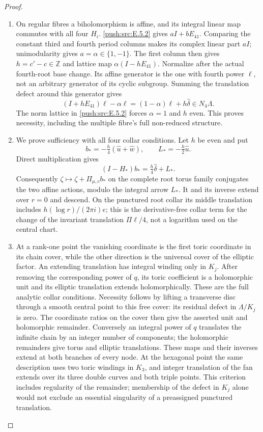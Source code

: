 \begin{proof}
\begin{enumerate}[label={$\langle1\rangle$\arabic*.},leftmargin=*]
\item On regular fibres a biholomorphism is affine, and its integral
linear map commutes with all four $H_i$.  \ref{push:src:E.5.2} gives
$aI+bE_{41}$.  Comparing the constant third and fourth
period columns makes its complex linear part $aI$;
unimodularity gives $a=\alpha\in\{1,-1\}$.
The first column then gives $h=c'-c\in\mathbb Z$ and
lattice map $\alpha(I-hE_{41})$.
Normalize after the actual fourth-root base change.  Its
affine generator is the one with fourth power $\ell$, not
an arbitrary generator of its cyclic subgroup.  Summing the
translation defect around this generator gives
\[
 (I+hE_{41})\ell-\alpha\ell
 =(1-\alpha)\ell+h\widehat\delta\in N_4\Lambda.
\]
The norm lattice in \ref{push:src:E.5.2} forces $\alpha=1$ and $h$ even.
This proves necessity, including the multiple fibre's full
non-reduced structure.

\item We prove sufficiency with all four collar conditions.
Let $h$ be even and put
\[
 b_*=-\tfrac h4(\widehat u+\widehat w),\qquad
 L_*=-\tfrac h2\widehat u.
\]
Direct multiplication gives
\[
 (I-H_*)b_*=\tfrac h4\widehat\delta+L_*.
\]
Consequently $\zeta\mapsto\zeta+\Pi_{\mu,c}b_*$ on the
complete root torus family conjugates the two affine actions,
modulo the integral arrow $L_*$.  It and its inverse extend
over $r=0$ and descend.  On the punctured root collar its
middle translation includes
$h(\log r)/(2\pi i)e$; this is the derivative-free collar
term for the change of the invariant translation
$\Pi\ell/4$, not a logarithm used on the central chart.

\item At a rank-one point the vanishing coordinate is the first
toric coordinate in its chain cover, while the other
direction is the universal cover of the elliptic factor.
An extending translation has integral winding only in $K_j$.
After removing the corresponding power of $q$, its toric
coefficient is a holomorphic unit and its elliptic translation
extends holomorphically.  These are the full analytic collar
conditions.  Necessity follows by lifting a transverse disc
through a smooth central point to this free cover: its residual
defect in $\Lambda/K_j$ is zero.  The coordinate ratios on
the cover then give the asserted unit and holomorphic
remainder.  Conversely an integral power of $q$ translates
the infinite chain by an integer number of components;
the holomorphic remainders give torus and elliptic translations.
These maps and their inverses extend at both branches of every
node.  At the hexagonal point the same description uses two
toric windings in $K_3$, and integer translation of the fan
extends over its three double curves and both triple points.
This criterion includes regularity of the remainder; membership
of the defect in $K_j$ alone would not exclude an essential
singularity of a preassigned punctured translation.


\end{enumerate}
\end{proof}
